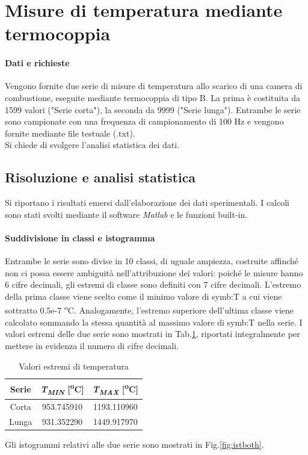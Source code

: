 \section{Misure di temperatura mediante termocoppia} \label{sez:misureT}
\paragraph{Dati e richieste}
Vengono fornite due serie di misure di temperatura allo scarico di una camera di combustione, eseguite mediante termocoppia di tipo B. La prima è costituita da 1599 valori ("Serie corta"), la seconda da 9999 ("Serie lunga"). Entrambe le serie sono campionate con una frequenza di campionamento di 100 Hz e vengono fornite mediante file testuale (.txt).\\
Si chiede di svolgere l'analisi statistica dei dati.
\subsection{Risoluzione e analisi statistica}
Si riportano i risultati emersi dall'elaborazione dei dati sperimentali. I calcoli sono stati svolti mediante il software \textit{Matlab} e le funzioni built-in.
\paragraph{Suddivisione in classi e istogramma}
Entrambe le serie sono divise in 10 classi, di uguale ampiezza, costruite affinché non ci possa essere ambiguità nell'attribuzione dei valori: poiché le misure hanno 6 cifre decimali, gli estremi di classe sono definiti con 7 cifre decimali. L'estremo della prima classe viene scelto come il minimo valore di \gls{symb:T} a cui viene sottratto 0.5e-7 \textsuperscript{o}C. Analogamente, l'estremo superiore dell'ultima classe viene calcolato sommando la stessa quantità al massimo valore di \gls{symb:T} nella serie. I valori estremi delle due serie sono mostrati in Tab.\ref{tab:estremitemp}, riportati integralmente per mettere in evidenza il numero di cifre decimali.
\begin{table} [H]
	\centering
	\begin{tabular}{c|c|c}
		\toprule
		\toprule
		\textbf{Serie} & \textbf{\textit{T\textsubscript{MIN}} [\textsuperscript{o}C]} &\textbf{\textit{T\textsubscript{MAX}} [\textsuperscript{o}C]} \\
		\midrule
		\midrule
		Corta & 953.745910 & 1193.110960\\
		\midrule
		Lunga & 931.352290 & 1449.917970 \\
		\bottomrule
		\bottomrule
	\end{tabular}
\caption{Valori estremi di temperatura}
\label{tab:estremitemp}
\end{table}
Gli istogrammi relativi alle due serie sono mostrati in Fig.\ref{fig:istboth}.


